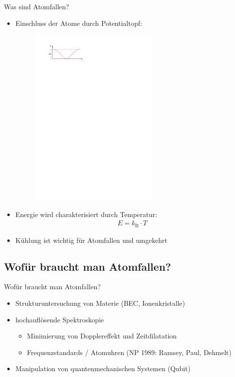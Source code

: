 \documentclass[12pt,xcolor=dvipsnames]{beamer}
\begin{document}
\begin{frame}{Was sind Atomfallen?}
	\begin{itemize}
		\item Einschluss der Atome durch Potentialtopf:
			\begin{figure}
				\centering
				\includegraphics[width=0.6\textwidth]{./figures/fallentiefe.pdf}
			\end{figure}
		\item Energie wird charakterisiert durch Temperatur:
		\begin{align*}
		E = k_\mathrm{B} \cdot T
		\end{align*}
		
		\item Kühlung ist wichtig für Atomfallen und umgekehrt
		
	\end{itemize}

\end{frame}

\subsection{Wofür braucht man Atomfallen?}
\begin{frame}{Wofür braucht man Atomfallen?}
	\begin{itemize}
		\item Strukturuntersuchung von Materie (BEC, Ionenkristalle)
		
		\item hochauflösende Spektroskopie
			\begin{itemize}
				\item Minimierung von Dopplereffekt und Zeitdilatation
				\item Frequenzstandards / Atomuhren (NP 1989: Ramsey, Paul, Dehmelt)
			\end{itemize}
		
		\item Manipulation von quantenmechanischen Systemen (Qubit)
	\end{itemize}
\end{frame}
\end{document}
